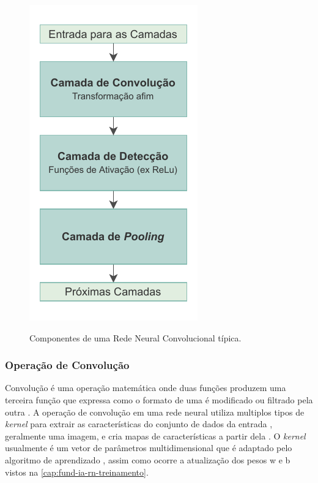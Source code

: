 \begin{figure}[h!] %
  \centering
  \caption{Componentes de uma Rede Neural Convolucional típica.}
  \includegraphics[scale=1.1]{img/img-fundamentacao-conv.pdf}
  \label{fig:fund-conv}
\end{figure}

\subsubsection{Operação de Convolução} \label{cap:fund-ia-rn-conv-conv}


Convolução é uma operação matemática onde duas funções produzem uma terceira função que expressa como o formato de uma é modificado ou filtrado pela outra \cite{ref:Yan}. A operação de convolução em uma rede neural utiliza multiplos tipos de \textit{kernel} para extrair as características do conjunto de dados da entrada \cite{ref:Eden-Ierapetritou-Towler}, geralmente uma imagem, e cria mapas de características a partir dela \cite{ref:Gholamalinezhad-Khosravi}. O \textit{kernel} usualmente é um vetor de parâmetros multidimensional que é adaptado pelo algoritmo de aprendizado \cite{ref:Goodfellow-Bengio-Courville}, assim como ocorre a atualização dos pesos w e b vistos na \autoref{cap:fund-ia-rn-treinamento}.


